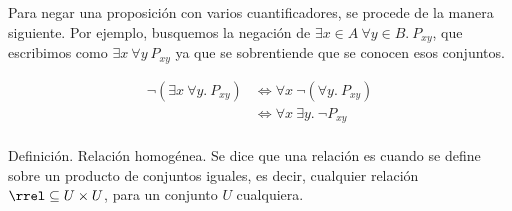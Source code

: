 \begin{example}
  Para negar una proposición con varios cuantificadores, se procede de la
  manera siguiente. Por ejemplo, busquemos la negación de $\exists x \in A \
  \forall y \in B. \ P_{xy}$, que escribimos como $\exists x \ \forall y \
  P_{xy}$ ya que se sobrentiende que se conocen esos conjuntos.

  \begin{align*}
    \neg(\exists x \ \forall y. \ P_{xy})
      &\iff \forall x \ \neg(\forall y. \ P_{xy}) \\
      &\iff \forall x \ \exists y. \ \neg P_{xy} \\
  \end{align*}
\end{example}

Definición. Relación homogénea. Se dice que una relación es
 cuando se define sobre un producto de conjuntos iguales,
es decir, cualquier relación $\rrel \subseteq U \times U$, para un conjunto
$U$ cualquiera.








